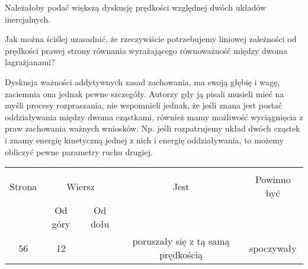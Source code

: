 \documentclass[a4paper,11pt]{article}
\begin{document}
\vspace{\spaceFour}





\noindent
{} Należałoby podać większą dyskusję prędkości względnej
dwóch układów inercjalnych.

\vspace{\spaceFour}





\noindent
  Jak można ściślej uzasadnić, że rzeczywiście
potrzebujemy liniowej zależności od prędkości prawej strony równania
wyrażającego równoważność między dwoma lagrażjanami? \Dok

\vspace{\spaceFour}




\noindent
{} Dyskusja ważności addytywnych zasad zachowania, ma
swoją głębię i wagę, zaciemnia ona jednak pewne szczegóły. Autorzy gdy
ją pisali musieli mieć na myśli procesy rozpraszania, nie wspomnieli
jednak, że jeśli znana jest postać oddziaływania między dwoma
cząstkami, również mamy możliwość wyciągnięcia z praw zachowania
ważnych wniosków. Np. jeśli rozpatrujemy układ dwóch cząstek i znamy
energię kinetyczną jednej z nich i energię oddziaływania, to możemy
obliczyć pewne parametry ruchu drugiej.





\newpage



\begin{center}

  \begin{tabular}{|c|c|c|c|c|}
    \hline
    & \multicolumn{2}{c|}{} & & \\
    Strona & \multicolumn{2}{c|}{Wiersz} & Jest
                              & Powinno być \\ \cline{2-3}
    & Od góry & Od dołu & & \\
    \hline
    56  & 12 & & poruszały się z tą samą prędkością & spoczywały \\
    \hline
  \end{tabular}

\end{center}

\vspace{\spaceTwo}
\end{document}
